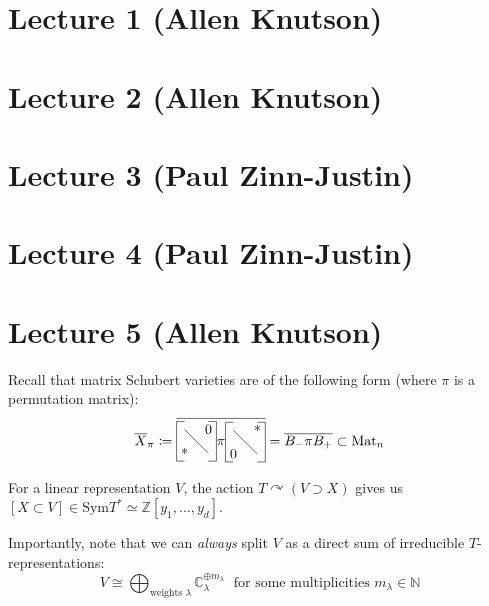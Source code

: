 \documentclass[12pt]{amsart}
\numberwithin{equation}{section}
\theoremstyle{definition}
\numberwithin{figure}{section}
\newcommand{\C}{\mathbb{C}}
\newcommand{\bN}{\mathbb{N}}
\newcommand{\Z}{\mathbb{Z}}
\begin{document}
\section{Lecture 1 (Allen Knutson)}

\section{Lecture 2 (Allen Knutson)}

\section{Lecture 3 (Paul Zinn-Justin)}

\section{Lecture 4 (Paul Zinn-Justin)}

\section{Lecture 5 (Allen Knutson)}


Recall that matrix Schubert varieties are of the following form (where $\pi$ is a permutation matrix): $$\overline{X}_{\pi} \coloneqq \overline{\vcenter{\hbox{\begin{tikzpicture}
\node at (.2,.2) {*};
\node at (.8,.8) {0};
\draw[-] (.2,.8) to (.8,.2);
\draw[-] (0,0) to (0,1);
\draw[-] (0,0) to (.2,0);
\draw[-] (0,1) to (.2,1);
\draw[-] (1,0) to (1,1);
\draw[-] (.8,0) to (1,0);
\draw [-] (.8,1) to (1,1);
\end{tikzpicture}}} \pi 
\vcenter{\hbox{\begin{tikzpicture}
\node at (.2,.2) {0};
\node at (.8,.8) {*};
\draw[-] (.2,.8) to (.8,.2);
\draw[-] (0,0) to (0,1);
\draw[-] (0,0) to (.2,0);
\draw[-] (0,1) to (.2,1);
\draw[-] (1,0) to (1,1);
\draw[-] (.8,0) to (1,0);
\draw [-] (.8,1) to (1,1);
\end{tikzpicture}}}} = \overline{B_- \pi B_+} \subset \text{Mat}_n$$

For a linear representation $V$, the action $T \curvearrowright (V \supset X)$ gives us $[X \subset V] \in \text{Sym}T^{\ast} \simeq \Z[y_1, \dots, y_d]$.

Importantly, note that we can \textit{always} split $V$ as a direct sum of irreducible $T$-representations: \\
$$V \cong \bigoplus_{\text{weights }\lambda} \C_{\lambda}^{\oplus m_{\lambda}} \; \text{ for some multiplicities } m_{\lambda} \in \bN$$
\end{document}
